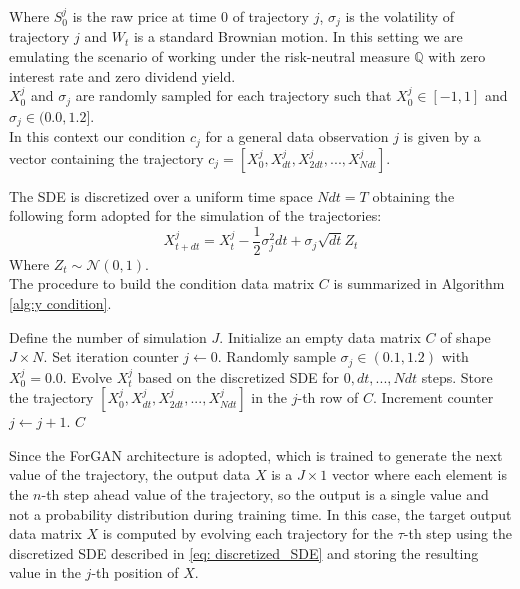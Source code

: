 Where $S_0^j$ is the raw price at time $0$ of trajectory $j$, $\sigma_j$ is the volatility of trajectory $j$ and $W_t$ is a standard Brownian motion.
In this setting we are emulating the scenario of working under the risk-neutral measure $\mathbb{Q}$ with zero interest rate and zero dividend yield.\\
$X_0^j$ and $\sigma_j$ are randomly sampled for each trajectory such that 
$X_0^j \in [-1, 1]$ and $\sigma_j \in (0.0, 1.2]$.\\

In this context our condition $c_j$ for a general data observation $j$ is given by
a vector containing the trajectory $c_j=[X_0^j, X_{dt}^j, X_{2dt}^j, ..., X_{Ndt}^j]$.

 The SDE is discretized over a uniform time space $N dt = T$ obtaining the following form
 adopted for the simulation of the trajectories:
 \begin{equation}
    \label{eq: discretized_SDE}
    X_{t+dt}^j = X_t^j -\frac{1}{2}\sigma_j^2 dt + \sigma_j \sqrt{dt} Z_t
 \end{equation}
 Where $Z_t \sim \mathcal{N}(0,1)$.\\
The procedure to build the condition data matrix $C$ is summarized in Algorithm \ref{alg:y condition}.

\begin{algorithm}[H]
\caption{Algorithm for the condition data matrix $C$ creation}
\label{alg:y condition}
\begin{algorithmic}[1]

\STATE Define the number of simulation $J$.
\STATE Initialize an empty data matrix $C$ of shape $J\times N$.
\STATE Set iteration counter $j \leftarrow 0$.
\REPEAT
    \STATE Randomly sample $\sigma_j \in (0.1, 1.2)$ with $X_0^j = 0.0$.
    \STATE Evolve $X_t^j$ based on the discretized SDE for $0, dt, ..., Ndt$ steps.
    \STATE Store the trajectory $[X_0^j, X_{dt}^j, X_{2dt}^j, ..., X_{Ndt}^j]$ in the $j$-th row of $C$.
    \STATE Increment counter $j \leftarrow j + 1$.
\RETURN $C$
\end{algorithmic}
\end{algorithm}


Since the ForGAN architecture is adopted, which is trained to generate the next value of the trajectory,
the output data $X$ is a $J \times 1$ vector where each element is the $n$-th step ahead value of the trajectory, 
so the output is a single value and not a probability distribution during training time. 
In this case, the target output data matrix $X$ is computed by evolving each trajectory for the $\tau$-th step using the discretized SDE 
described in  \ref{eq: discretized_SDE} and storing the resulting value in the $j$-th position of $X$.\\

